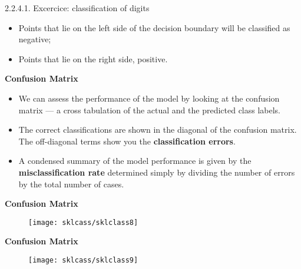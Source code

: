 2.2.4.1. Excercice: classification of digits\documentclass[MASTER.tex]{subfiles}
\begin{document}

	\begin{itemize}
	\item Points that lie on the left side of the decision boundary will be classified as negative; 
	\item Points that lie on the right side, positive. 
	\end{itemize}




	\Large
\textbf{Confusion Matrix}
\begin{itemize}
\item We can assess the performance of the model by looking at the confusion matrix — a cross tabulation of the actual and the predicted class labels. 

\item The correct classifications are shown in the diagonal of the confusion matrix. The off-diagonal terms show you the \textbf{classification errors}. 
\item A condensed summary of the model performance is given by the \textbf{misclassification rate} determined simply by dividing the number of errors by the total number of cases.
\end{itemize}




\textbf{Confusion Matrix}\begin{figure}
\centering
\texttt{[image: sklcass/sklclass8]}

\end{figure}


\textbf{Confusion Matrix}
\begin{figure}
\centering
\texttt{[image: sklcass/sklclass9]}

\end{figure}



\end{document}
